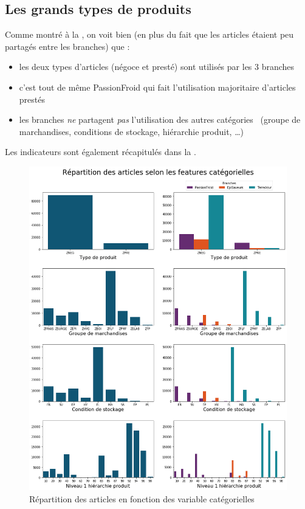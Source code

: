             \subsection{Les grands types de produits}

            Comme montré à la , on voit bien (en plus du fait que les articles étaient peu partagés entre les branches) que : 
            \begin{itemize}
                \item les deux types d'articles (négoce et presté) sont utilisés par les 3 branches
                \item c'est tout de même PassionFroid qui fait l'utilisation majoritaire d'articles prestés
                \item les branches \emph{ne} partagent \emph{pas} l'utilisation des autres \og catégories \fg\ (groupe de marchandises, conditions de stockage, hiérarchie produit, \dots)
            \end{itemize}
            Les indicateurs sont également récapitulés dans la .

            \begin{figure}[htbp]
                \begin{center}
                \includegraphics[width=\linewidth]{img/Repartition articles categories.png}
                \end{center}
                \caption{Répartition des articles en fonction des variable catégorielles}
                \label{fig:repart_art_categ}
            \end{figure}

